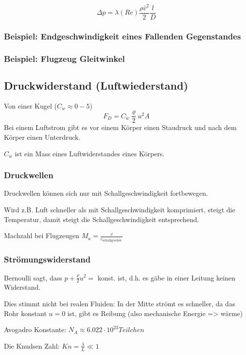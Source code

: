 \documentclass[a4paper]{scrartcl}
\begin{document}
	\[
	\Delta p = \lambda(Re) \frac{\rho \bar{v}^2}{2}\frac{l}{D}
	\]

\subsubsection{Beispiel: Endgeschwindigkeit eines Fallenden Gegenstandes}

\subsubsection{Beispiel: Flugzeug Gleitwinkel}

\subsection{Druckwiderstand (Luftwiederstand)}
	Von einer Kugel ($C_w \approx 0-5$)
	\[
		F_D = C_w \frac{\varrho}{2} u^2 A
	\]
	Bei einem Luftstrom gibt es vor einem Körper einen Staudruck und nach dem Körper einen Unterdruck.
	
	
	$C_w$ ist ein Mass eines Luftwiderstandes eines Körpers.



\subsubsection{Druckwellen}
	Druckwellen können sich nur mit Schallgeschwindigkeit fortbewegen.
	
	Wird z.B. Luft schneller als mit Schallgeschwindigkeit komprimiert, steigt die Temperatur, damit steigt die Schallgeschwindigkeit entsprechend.
	
	Machzahl bei Flugzeugen $M_a = \frac{v}{c_{\text{schallgeschw.}}}$




\subsubsection{Strömungswiderstand}
Bernoulli sagt, dass $p + \frac{\rho}{2} u^2 =$ konst. ist, d.h. es gäbe in einer Leitung keinen Widerstand.

Dies stimmt nicht bei realen Fluiden: In der Mitte strömt es schneller, da das Rohr konstant $u=0$ ist, gibt es Reibung (also mechanische Energie => wärme)




Avogadro Konstante: $N_A \approx 6.022 \cdot 10^23 Teilchen$

Die Knudsen Zahl: $Kn = \frac{\lambda}{L} \ll 1$
\end{document}
